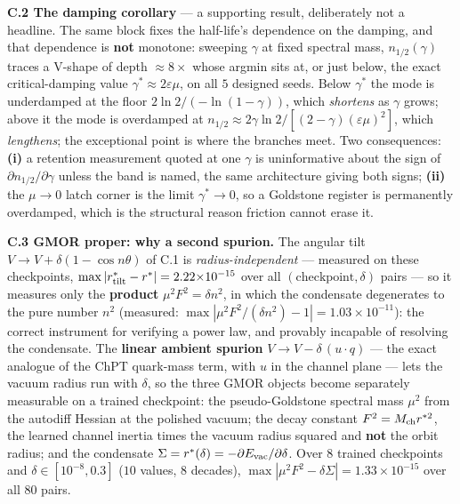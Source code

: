 \documentclass{article}
\begin{document}
\textbf{C.2 The damping corollary} --- a supporting result, deliberately not a headline. The same block fixes the half-life's dependence on the damping, and that dependence is \textbf{not} monotone: sweeping $\gamma$ at fixed spectral mass, $n_{1/2}(\gamma)$ traces a V-shape of depth $\approx8\times$ whose argmin sits at, or just below, the exact critical-damping value $\gamma^*\approx2\varepsilon\mu$, on all $5$ designed seeds. Below $\gamma^*$ the mode is underdamped at the floor $2\ln2/(-\ln(1-\gamma))$, which \emph{shortens} as $\gamma$ grows; above it the mode is overdamped at $n_{1/2}\approx2\gamma\ln2/[(2-\gamma)(\varepsilon\mu)^2]$, which \emph{lengthens}; the exceptional point is where the branches meet. Two consequences: \textbf{(i)} a retention measurement quoted at one $\gamma$ is uninformative about the sign of $\partial n_{1/2}/\partial\gamma$ unless the band is named, the same architecture giving both signs; \textbf{(ii)} the $\mu\to0$ latch corner is the limit $\gamma^*\to0$, so a Goldstone register is permanently overdamped, which is the structural reason friction cannot erase it.

\textbf{C.3 GMOR proper: why a second spurion.} The angular tilt $V\to V+\delta(1-\cos n\theta)$ of C.1 is \emph{radius-independent} --- measured on these checkpoints, $\max|r^*_{\rm tilt}-r^*|=2.22{\times}10^{-15}$ over all $(\text{checkpoint},\delta)$ pairs --- so it measures only the \textbf{product} $\mu^2F^2=\delta n^2$, in which the condensate degenerates to the pure number $n^2$ (measured: $\max|\mu^2F^2/(\delta n^2)-1|=1.03{\times}10^{-11}$): the correct instrument for verifying a power law, and provably incapable of resolving the condensate. The \textbf{linear ambient spurion} $V\to V-\delta\,(u\cdot q)$ --- the exact analogue of the ChPT quark-mass term, with $u$ in the channel plane --- lets the vacuum radius run with $\delta$, so the three GMOR objects become separately measurable on a trained checkpoint: the pseudo-Goldstone spectral mass $\mu^2$ from the autodiff Hessian at the polished vacuum; the decay constant $F^2=M_{\rm ch}r^{*2}$, the learned channel inertia times the vacuum radius squared and \textbf{not} the orbit radius; and the condensate $\Sigma=r^*(\delta)=-\partial E_{\rm vac}/\partial\delta$. Over $8$ trained checkpoints and $\delta\in[10^{-8},0.3]$ ($10$ values, $8$ decades), $\max|\mu^2F^2-\delta\Sigma|=1.33{\times}10^{-15}$ over all $80$ pairs.
\end{document}
